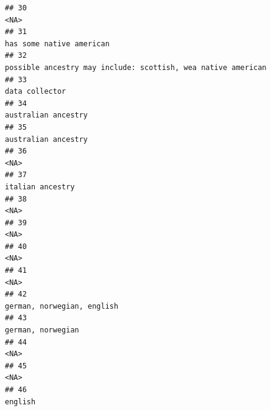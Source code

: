 \documentclass[]{article}
\begin{document}
\begin{verbatim}
## 30                                                                                                                                                 <NA>
## 31                                                                                                                             has some native american
## 32                                                                                         possible ancestry may include: scottish, wea native american
## 33                                                                                                                                       data collector
## 34                                                                                                                                  australian ancestry
## 35                                                                                                                                  australian ancestry
## 36                                                                                                                                                 <NA>
## 37                                                                                                                                     italian ancestry
## 38                                                                                                                                                 <NA>
## 39                                                                                                                                                 <NA>
## 40                                                                                                                                                 <NA>
## 41                                                                                                                                                 <NA>
## 42                                                                                                                           german, norwegian, english
## 43                                                                                                                                    german, norwegian
## 44                                                                                                                                                 <NA>
## 45                                                                                                                                                 <NA>
## 46                                                                                                                                              english

\end{verbatim}
\end{document}
